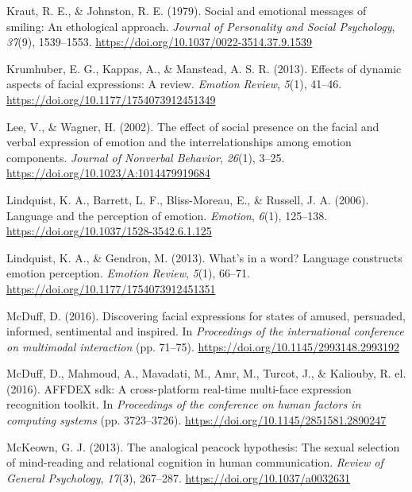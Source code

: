 \documentclass[
  english,
  doc]{apa7}
\newlength{\cslhangindent}
\newenvironment{cslreferences}%
  {\setlength{\parindent}{0pt}%
  \everypar{\setlength{\hangindent}{\cslhangindent}}\ignorespaces}%
  {\par}
\begin{document}
\begin{cslreferences}
\leavevmode\hypertarget{ref-kraut1979social}{}%
Kraut, R. E., \& Johnston, R. E. (1979). Social and emotional messages of smiling: An ethological approach. \emph{Journal of Personality and Social Psychology}, \emph{37}(9), 1539--1553. \url{https://doi.org/10.1037/0022-3514.37.9.1539}

\leavevmode\hypertarget{ref-krumhuber2013effects}{}%
Krumhuber, E. G., Kappas, A., \& Manstead, A. S. R. (2013). Effects of dynamic aspects of facial expressions: A review. \emph{Emotion Review}, \emph{5}(1), 41--46. \url{https://doi.org/10.1177/1754073912451349}

\leavevmode\hypertarget{ref-lee2002effect}{}%
Lee, V., \& Wagner, H. (2002). The effect of social presence on the facial and verbal expression of emotion and the interrelationships among emotion components. \emph{Journal of Nonverbal Behavior}, \emph{26}(1), 3--25. \url{https://doi.org/10.1023/A:1014479919684}

\leavevmode\hypertarget{ref-lindquist2006language}{}%
Lindquist, K. A., Barrett, L. F., Bliss-Moreau, E., \& Russell, J. A. (2006). Language and the perception of emotion. \emph{Emotion}, \emph{6}(1), 125--138. \url{https://doi.org/10.1037/1528-3542.6.1.125}

\leavevmode\hypertarget{ref-lindquist2013s}{}%
Lindquist, K. A., \& Gendron, M. (2013). What's in a word? Language constructs emotion perception. \emph{Emotion Review}, \emph{5}(1), 66--71. \url{https://doi.org/10.1177/1754073912451351}

\leavevmode\hypertarget{ref-mcduff2016discovering}{}%
McDuff, D. (2016). Discovering facial expressions for states of amused, persuaded, informed, sentimental and inspired. In \emph{Proceedings of the international conference on multimodal interaction} (pp. 71--75). \url{https://doi.org/10.1145/2993148.2993192}

\leavevmode\hypertarget{ref-mcduff2016affdex}{}%
McDuff, D., Mahmoud, A., Mavadati, M., Amr, M., Turcot, J., \& Kaliouby, R. el. (2016). AFFDEX sdk: A cross-platform real-time multi-face expression recognition toolkit. In \emph{Proceedings of the conference on human factors in computing systems} (pp. 3723--3726). \url{https://doi.org/10.1145/2851581.2890247}

\leavevmode\hypertarget{ref-mckeown2013analogical}{}%
McKeown, G. J. (2013). The analogical peacock hypothesis: The sexual selection of mind-reading and relational cognition in human communication. \emph{Review of General Psychology}, \emph{17}(3), 267--287. \url{https://doi.org/10.1037/a0032631}


\end{cslreferences}
\end{document}
